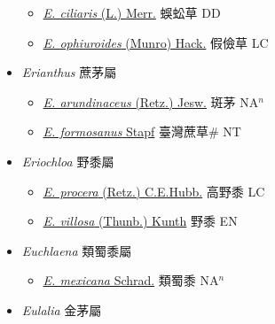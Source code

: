 \begin{itemize}
  \begin{itemize}
        \item[] \href{http://www.theplantlist.org/tpl1.1/search?q=Eremochloa+ciliaris}{\textit{E. ciliaris} (L.) Merr.}   蜈蚣草 DD
        \item[] \href{http://www.theplantlist.org/tpl1.1/search?q=Eremochloa+ophiuroides}{\textit{E. ophiuroides} (Munro) Hack.}   假儉草 LC
  \end{itemize}
 \item[] \textit{Erianthus} 蔗茅屬
                    
  \begin{itemize}
        \item[] \href{http://www.theplantlist.org/tpl1.1/search?q=Erianthus+arundinaceus}{\textit{E. arundinaceus} (Retz.) Jesw.}   斑茅 NA$^n$
        \item[] \href{http://www.theplantlist.org/tpl1.1/search?q=Erianthus+formosanus}{\textit{E. formosanus} Stapf}   臺灣蔗草\# NT
  \end{itemize}
 \item[] \textit{Eriochloa} 野黍屬
                    
  \begin{itemize}
        \item[] \href{http://www.theplantlist.org/tpl1.1/search?q=Eriochloa+procera}{\textit{E. procera} (Retz.) C.E.Hubb.}   高野黍 LC
        \item[] \href{http://www.theplantlist.org/tpl1.1/search?q=Eriochloa+villosa}{\textit{E. villosa} (Thunb.) Kunth}   野黍 EN
  \end{itemize}
 \item[] \textit{Euchlaena} 類蜀黍屬
                    
  \begin{itemize}
        \item[] \href{http://www.theplantlist.org/tpl1.1/search?q=Euchlaena+mexicana}{\textit{E. mexicana} Schrad.}   類蜀黍 NA$^n$
  \end{itemize}
 \item[] \textit{Eulalia} 金茅屬
                    

\end{itemize}
